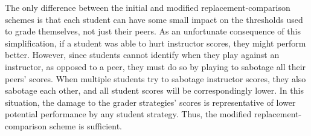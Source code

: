 \documentclass[pageno]{jpaper}
\begin{document}
The only difference between the initial and modified replacement-comparison schemes is that each student can have some small impact on the thresholds used to grade themselves, not just their peers.
As an unfortunate consequence of this simplification, if a student was able to hurt instructor scores, they might perform better.
However, since students cannot identify when they play against an instructor, as opposed to a peer, they must do so by playing to sabotage all their peers' scores.
When multiple students try to sabotage instructor scores, they also sabotage each other, and all student scores will be correspondingly lower.
In this situation, the damage to the grader strategies' scores is representative of lower potential performance by any student strategy.
Thus, the modified replacement-comparison scheme is sufficient.
\end{document}
